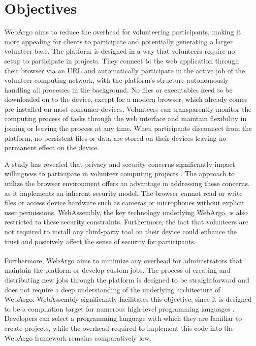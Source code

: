 \section{Objectives}
\label{sec:intro:objectives}
WebArgo aims to reduce the overhead for volunteering participants, making it more appealing for clients to participate and potentially generating a larger volunteer base. The platform is designed in a way that volunteers require no setup to participate in projects. They connect to the web application through their browser via an \acs{URL} and automatically participate in the active job of the volunteer computing network, with the platform's structure autonomously handling all processes in the background. No files or executables need to be downloaded on to the device, except for a modern browser, which already comes pre-installed on most consumer devices. Volunteers can transparently monitor the computing process of tasks through the web interface and maintain flexibility in joining or leaving the process at any time. When participants disconnect from the platform, no persistent files or data are stored on their devices leaving no permanent effect on the device.

A study has revealed that privacy and security concerns significantly impact willingness to participate in volunteer computing projects \cite{intro:volunteerStudy}. The approach to utilize the browser environment offers an advantage in addressing these concerns, as it implements an inherent security model. The browser cannot read or write files or access device hardware such as cameras or microphones without explicit user permissions. WebAssembly, the key technology underlying WebArgo, is also restricted to these security constraints. Furthermore, the fact that volunteers are not required to install any third-party tool on their device could enhance the trust and positively affect the sense of security for participants.
\\~\\
Furthermore, WebArgo aims to minimize any overhead for administrators that maintain the platform or develop custom jobs. The process of creating and distributing new jobs through the platform is designed to be straightforward and does not require a deep understanding of the underlying architecture of WebArgo. WebAssembly significantly facilitates this objective, since it is designed to be a compilation target for numerous high-level programming languages \cite{methodology:wasm, methodology:wasmW3C, methodology:wasmdocu, relatedwork:wasmedgecomputing}. Developers can select a programming language with which they are familiar to create projects, while the overhead required to implement this code into the WebArgo framework remains comparatively low. 

